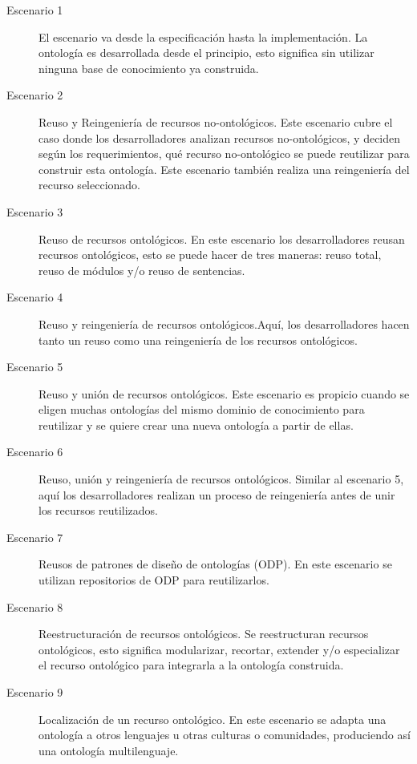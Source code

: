\begin{description}
    \item[Escenario 1] El escenario va desde la especificación hasta la implementación. La ontología es desarrollada desde el principio, esto significa sin utilizar ninguna base de conocimiento ya construida.
    \item[Escenario 2] Reuso y Reingeniería de recursos no-ontológicos. Este escenario cubre el caso donde los desarrolladores analizan recursos no-ontológicos, y deciden según los requerimientos, qué recurso no-ontológico se puede reutilizar para construir esta ontología. Este escenario también realiza una reingeniería del recurso seleccionado.
    \item[Escenario 3] Reuso de recursos ontológicos. En este escenario los desarrolladores reusan recursos ontológicos, esto se puede hacer de tres maneras: reuso total, reuso de módulos y/o reuso de sentencias.
    \item[Escenario 4] Reuso y reingeniería de recursos ontológicos.Aquí, los desarrolladores hacen tanto un reuso como una reingeniería de los recursos ontológicos.
    \item[Escenario 5] Reuso y unión de recursos ontológicos. Este escenario es propicio cuando se eligen muchas ontologías del mismo dominio de conocimiento para reutilizar y se quiere crear una nueva ontología a partir de ellas.
    \item[Escenario 6] Reuso, unión y reingeniería de recursos ontológicos. Similar al escenario 5, aquí los desarrolladores realizan un proceso de reingeniería antes de unir los recursos reutilizados.
    \item[Escenario 7] Reusos de patrones de diseño de ontologías (ODP). En este escenario se utilizan repositorios de ODP para reutilizarlos.
    \item[Escenario 8] Reestructuración de recursos ontológicos. Se reestructuran recursos ontológicos, esto significa modularizar, recortar, extender y/o especializar el recurso ontológico para integrarla a la ontología construida.
    \item[Escenario 9] Localización de un recurso ontológico. En este escenario se adapta una ontología a otros lenguajes u otras culturas o comunidades, produciendo así una ontología multilenguaje.
\end{description}

